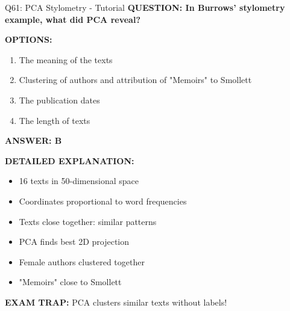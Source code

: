 \documentclass[8pt]{beamer}
\begin{document}
	\begin{frame}{Q61: PCA Stylometry - Tutorial}
		\fontsize{6.5}{7.5}\selectfont
		\textbf{QUESTION: In Burrows' stylometry example, what did PCA reveal?}
		
		\vspace{0.1cm}
		\textbf{OPTIONS:}
		\begin{enumerate}
			\item The meaning of the texts
			\item Clustering of authors and attribution of "Memoirs" to Smollett
			\item The publication dates
			\item The length of texts
		\end{enumerate}
		
		\vspace{0.1cm}
		\textcolor{myblue}{\textbf{ANSWER: B}}
		
		\vspace{0.1cm}
		\textbf{DETAILED EXPLANATION:}
		\begin{itemize}
			\item 16 texts in 50-dimensional space
			\item Coordinates proportional to word frequencies
			\item Texts close together: similar patterns
			\item PCA finds best 2D projection
			\item Female authors clustered together
			\item "Memoirs" close to Smollett
		\end{itemize}
		
		\vspace{0.1cm}
		\textcolor{myred}{\textbf{EXAM TRAP:}} PCA clusters \textcolor{myblue}{similar texts without labels}!
	\end{frame}
	
\end{document}
